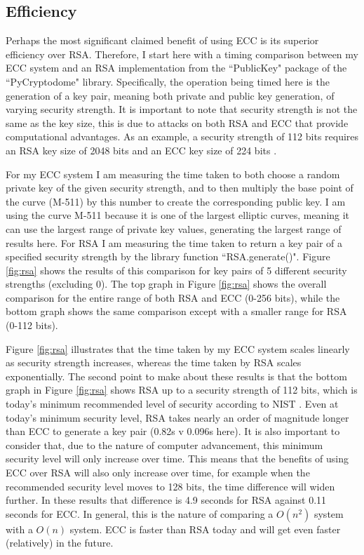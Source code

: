 \documentclass[12pt,a4paper]{article}
\begin{document}
\subsection{Efficiency} \noindent \label{Efficiency}
Perhaps the most significant claimed benefit of using ECC is its superior efficiency over RSA. 
Therefore, I start here with a timing comparison between my ECC system and an RSA implementation 
from the ``PublicKey" package of the ``PyCryptodome" library. 
Specifically, the operation being timed here is the generation of a key pair, meaning both private and public key generation, 
of varying security strength. 
It is important to note that security strength is not the same as the key size, this is due to attacks on both RSA and ECC that provide computational advantages. 
As an example, a security strength of 112 bits requires an RSA key size of 2048 bits and an ECC key size of 224 bits \cite[p54-55]{barker2020recommendation}. 

For my ECC system I am measuring the time taken to both choose a random private key of the given security strength, 
and to then multiply the base point of the curve (M-511) by this number to create the corresponding public key. 
I am using the curve M-511 because it is one of the largest elliptic curves, 
meaning it can use the largest range of private key values, generating the largest range of results here. 
For RSA I am measuring the time taken to return a key pair of a specified security strength by the library function ``RSA.generate()". 
Figure \ref{fig:rsa} shows the results of this comparison for key pairs of 5 different security strengths (excluding 0). 
The top graph in Figure \ref{fig:rsa} shows the overall comparison for the entire range of both RSA and ECC (0-256 bits), 
while the bottom graph shows the same comparison except with a smaller range for RSA (0-112 bits). 

Figure \ref{fig:rsa} illustrates that the time taken by my ECC system scales linearly as security strength increases, 
whereas the time taken by RSA scales exponentially. 
The second point to make about these results is that the bottom graph in Figure \ref{fig:rsa} shows RSA up to a security strength of 112 bits, 
which is today's minimum recommended level of security according to NIST \cite[p54-55]{barker2020recommendation}. 
Even at today's minimum security level, RSA takes nearly an order of magnitude longer than ECC to generate a key pair (0.82s v 0.096s here). 
It is also important to consider that, due to the nature of computer advancement, this minimum security level will only increase over time. 
This means that the benefits of using ECC over RSA will also only increase over time, 
for example when the recommended security level moves to 128 bits, the time difference will widen further. 
In these results that difference is 4.9 seconds for RSA against 0.11 seconds for ECC. 
In general, this is the nature of comparing a $O(n^2)$ system with a $O(n)$ system. 
ECC is faster than RSA today and will get even faster (relatively) in the future. 
\end{document}
